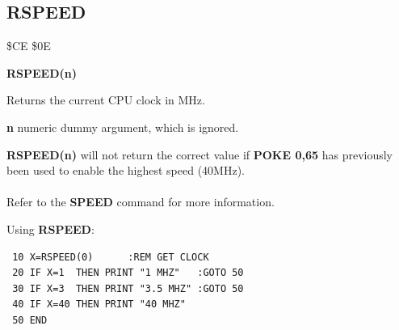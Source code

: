 \subsection{RSPEED}
\begin{description}[leftmargin=2cm,style=nextline]
\item [Token:] \$CE \$0E
\item [Format:] {\bf RSPEED(n)}
\item [Usage:]  Returns the current CPU clock in MHz.

                {\bf n} numeric dummy argument, which is ignored.

\item [Remarks:] {\bf RSPEED(n)} will not return the correct value if {\bf POKE 0,65}
                 has previously been used to enable the highest speed (40MHz).
                 \\
                 \\
                 Refer to the {\bf SPEED} command for more information.

\item \item [Example:] Using {\bf RSPEED}:
\begin{tcolorbox}[colback=black,coltext=white]
\verbatimfont{\codefont}
\begin{verbatim}
 10 X=RSPEED(0)      :REM GET CLOCK
 20 IF X=1  THEN PRINT "1 MHZ"   :GOTO 50
 30 IF X=3  THEN PRINT "3.5 MHZ" :GOTO 50
 40 IF X=40 THEN PRINT "40 MHZ"
 50 END
\end{verbatim}
\end{tcolorbox}
\end{description}


\newpage
